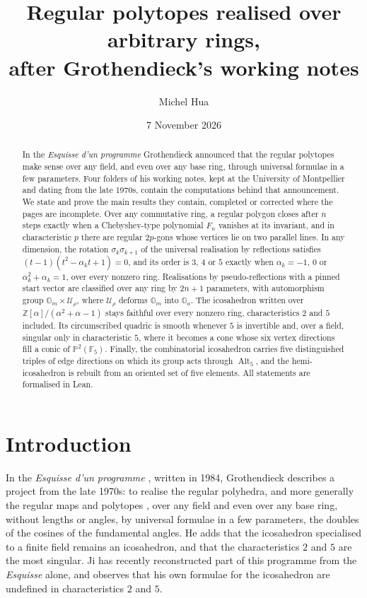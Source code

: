 \documentclass[11pt,a4paper]{amsart}
\title[Regular polytopes over rings]{Regular polytopes realised over arbitrary rings,\\ after Grothendieck's working notes}
\author{Michel Hua}
\date{7 November 2026}
\theoremstyle{definition}
\theoremstyle{remark}
\newcommand{\Alt}{\operatorname{Alt}}
\begin{document}
\begin{abstract}
In the \emph{Esquisse d'un programme} Grothendieck announced that the regular polytopes make sense over any field, and even over any base ring, through universal formulae in a few parameters. Four folders of his working notes, kept at the University of Montpellier and dating from the late 1970s, contain the computations behind that announcement. We state and prove the main results they contain, completed or corrected where the pages are incomplete. Over any commutative ring, a regular polygon closes after $n$ steps exactly when a Chebyshev-type polynomial $F_n$ vanishes at its invariant, and in characteristic $p$ there are regular $2p$-gons whose vertices lie on two parallel lines. In any dimension, the rotation $\sigma_k\sigma_{k+1}$ of the universal realisation by reflections satisfies $(t-1)(t^2-\alpha_k t+1) = 0$, and its order is $3$, $4$ or $5$ exactly when $\alpha_k = -1$, $0$ or $\alpha_k^2 + \alpha_k = 1$, over every nonzero ring. Realisations by pseudo-reflections with a pinned start vector are classified over any ring by $2n+1$ parameters, with automorphism group $\mathbb G_m \times \mathcal U_\rho$, where $\mathcal U_\rho$ deforms $\mathbb G_m$ into $\mathbb G_a$. The icosahedron written over $\mathbb Z[\alpha]/(\alpha^2+\alpha-1)$ stays faithful over every nonzero ring, characteristics $2$ and $5$ included. Its circumscribed quadric is smooth whenever $5$ is invertible and, over a field, singular only in characteristic $5$, where it becomes a cone whose six vertex directions fill a conic of $\mathbb P^2(\mathbb F_5)$. Finally, the combinatorial icosahedron carries five distinguished triples of edge directions on which its group acts through $\Alt_5$, and the hemi-icosahedron is rebuilt from an oriented set of five elements. All statements are formalised in Lean.
\end{abstract}

\maketitle

\section{Introduction}

In the \emph{Esquisse d'un programme} \cite[\S4]{esquisse}, written in 1984, Grothendieck describes a project from the late 1970s: to realise the regular polyhedra, and more generally the regular maps and polytopes \cite{coxeter1973,mcmullenschulte2002}, over any field and even over any base ring, without lengths or angles, by universal formulae in a few parameters, the doubles of the cosines of the fundamental angles. He adds that the icosahedron specialised to a finite field remains an icosahedron, and that the characteristics $2$ and $5$ are the most singular. Ji \cite{ji2023} has recently reconstructed part of this programme from the \emph{Esquisse} alone, and observes that his own formulae for the icosahedron are undefined in characteristics $2$ and $5$.
\end{document}
